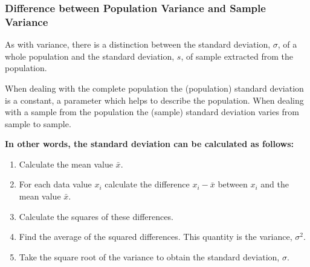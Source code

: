 \subsubsection{Difference between Population Variance and Sample Variance}
As with variance, there is a distinction between the standard deviation, $\sigma$, of a whole population and the standard deviation, $s$, of sample extracted from the population.

When dealing with the complete population the (population) standard deviation is a constant, a parameter which helps to describe the population. When dealing with a sample from the population the (sample) standard deviation varies from sample to sample. \newline

\textbf{In other words, the standard deviation can be calculated as follows:}

\begin{enumerate}
\item Calculate the mean value $\bar{x}$.
\item For each data value $x_i$ calculate the difference $x_i - \bar{x}$ between $x_i$ and the mean value $\bar{x}$.
\item Calculate the squares of these differences.
\item Find the average of the squared differences. This quantity is the variance, $\sigma^2$.
\item Take the square root of the variance to obtain the standard deviation, $\sigma$.
\end{enumerate}


